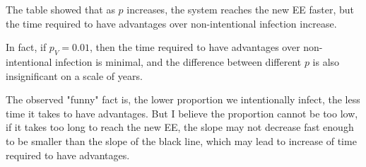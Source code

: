 \documentclass[12pt]{article}
\newcommand{\pmV}{p_{V}}
\begin{document}
The table showed that as $p$ increases, the system reaches the new EE faster, but the time required to have advantages over non-intentional infection increase.

In fact, if $\pmV=0.01$, then the time required to have advantages over non-intentional infection is minimal, and the difference between different $p$ is also insignificant on a scale of years.

The observed "funny" fact is, the lower proportion we intentionally infect, the less time it takes to have advantages. But I believe the proportion cannot be too low, if it takes too long to reach the new EE, the slope may not decrease fast enough to be smaller than the slope of the black line, which may lead to increase of time required to have advantages.
\end{document}
